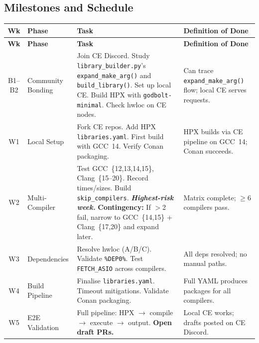 \documentclass[11pt, a4paper]{article}
\newcommand{\code}[1]{\texttt{#1}}
\newcommand{\cefile}[1]{\texttt{#1}}
\begin{document}
\subsection*{Milestones and Schedule}

\begin{longtable}{|c|p{2.2cm}|p{5.8cm}|p{3.5cm}|}
\hline
\rowcolor{rowgray}
\textbf{Wk} & \textbf{Phase} & \textbf{Task} & \textbf{Definition of Done} \\
\hline
\endfirsthead
\hline
\rowcolor{rowgray}
\textbf{Wk} & \textbf{Phase} & \textbf{Task} & \textbf{Definition of Done} \\
\hline
\endhead
\hline
\endfoot

B1--B2 & Community Bonding &
  Join CE Discord.  Study \cefile{library\_builder.py}'s
  \code{expand\_make\_arg()} and \code{build\_library()}.
  Set up local CE.  Build HPX with \code{godbolt-minimal}.
  Check hwloc on CE nodes.
  & Can trace \code{expand\_make\_arg()} flow; local CE serves requests. \\
\hline

W1 & Local Setup &
  Fork CE repos.  Add HPX \code{libraries.yaml}.
  First build with GCC~14.  Verify Conan packaging.
  & HPX builds via CE pipeline on GCC~14; Conan succeeds. \\
\hline

W2 & Multi-Compiler &
  Test GCC~\{12,13,14,15\}, Clang~\{15--20\}.
  Record times/sizes.  Build \code{skip\_compilers}.
  \newline\textit{\textbf{Highest-risk week.}}
  \textbf{Contingency:} If $>$2 fail, narrow to GCC~\{14,15\}
  + Clang~\{17,20\} and expand later.
  & Matrix complete; $\geq$6 compilers pass. \\
\hline

W3 & Dependencies &
  Resolve hwloc (A/B/C).  Validate \code{\%DEP0\%}.
  Test \code{FETCH\_ASIO} across compilers.
  & All deps resolved; no manual paths. \\
\hline

W4 & Build Pipeline &
  Finalise \code{libraries.yaml}.  Timeout mitigations.
  Validate Conan packaging.
  & Full YAML produces packages for all compilers. \\
\hline

W5 & E2E Validation &
  Full pipeline: HPX $\to$ compile $\to$ execute $\to$ output.
  \textbf{Open draft PRs.}
  & Local CE works; drafts posted on CE Discord. \\
\hline


\end{longtable}
\end{document}
